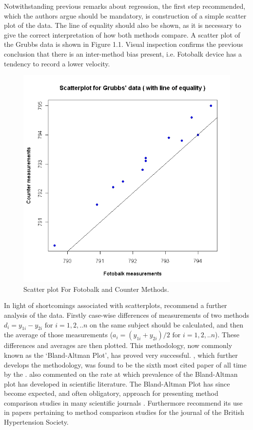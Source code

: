 \documentclass[12pt, a4paper]{report}
\begin{document}
Notwithstanding previous remarks about regression, the first step
recommended, which the authors argue should be mandatory, is
construction of a simple scatter plot of the data. The line of
equality should also be shown, as it is necessary to give the
correct interpretation of how both methods compare. A scatter plot
of the Grubbs data is shown in Figure 1.1. Visual inspection confirms the previous conclusion that there is an
inter-method bias present, i.e. Fotobalk device has a tendency to
record a lower velocity.

\begin{figure}[h!]
\begin{center}
  \includegraphics[width=130mm]{GrubbsScatter.jpeg}
  \caption{Scatter plot For Fotobalk and Counter Methods.}\label{GrubbsScatter}
\end{center}
\end{figure}

In light of shortcomings associated with scatterplots,
\citet*{BA83} recommend a further analysis of the data. Firstly
case-wise differences of measurements of two methods $d_{i} =
y_{1i}-y_{2i} \mbox{ for }i=1,2,..n$ on the same subject should be
calculated, and then the average of those measurements ($a_{i} =
(y_{1i} + y_{2i})/2 \mbox{ for }i=1,2,..n$). These differences and
averages are then plotted. This methodology, now commonly known as
the `Bland-Altman Plot', has proved very successful.
\citet*{BA86}, which further develops the methodology, was found
to be the sixth most cited paper of all time by the
\citet{BAcite}. \cite{Dewitte} also commented on the rate at which
prevalence of the Bland-Altman plot has developed in scientific
literature. The Bland-Altman Plot has since become expected, and
often obligatory, approach for presenting method comparison
studies in many scientific journals \citep{hollis}. Furthermore
\citet{BritHypSoc} recommend its use in papers pertaining to
method comparison studies for the journal of the British
Hypertension Society.
\end{document}
